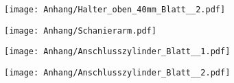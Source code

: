 \begin{figure}  
	\texttt{[image: Anhang/Halter\_oben\_40mm\_Blatt\_\_2.pdf]}
\end{figure}

\begin{figure}  
	\texttt{[image: Anhang/Schanierarm.pdf]}
\end{figure}

\begin{figure}  
	\texttt{[image: Anhang/Anschlusszylinder\_Blatt\_\_1.pdf]}
\end{figure}

\begin{figure}  
	\texttt{[image: Anhang/Anschlusszylinder\_Blatt\_\_2.pdf]}
\end{figure}
